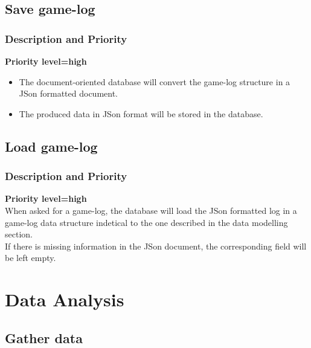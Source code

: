 \documentclass{scrreprt}
\begin{document}
\subsection{Save game-log}
\subsubsection{Description and Priority}
\textbf{Priority level=high}\\
\begin{itemize}
\item The document-oriented database will convert the game-log structure in a JSon formatted document.
\item The produced data in JSon format will be stored in the database.
\end{itemize}

\subsection{Load game-log}
\subsubsection{Description and Priority}
\textbf{Priority level=high}\\
When asked for a game-log, the database will load the JSon formatted log in a game-log data structure indetical to the one described in the data modelling section.\\
If there is missing information in the JSon document, the corresponding field will be left empty.


\section{Data Analysis}
\subsection{Gather data}
\end{document}
